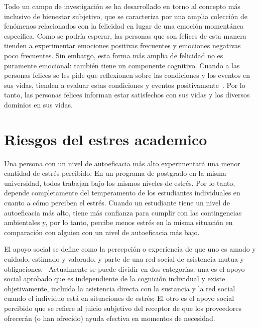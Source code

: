 \documentclass[jou,apacite]{apa6}
\begin{document}
Todo un campo de investigación se ha desarrollado en torno al concepto más inclusivo de bienestar subjetivo, que se caracteriza por una amplia colección de fenómenos relacionados con la felicidad en lugar de una emoción momentánea específica. Como se podría esperar, las personas que son felices de esta manera tienden a experimentar emociones positivas frecuentes y emociones negativas poco frecuentes. Sin embargo, esta forma más amplia de felicidad no es puramente emocional: también tiene un componente cognitivo. Cuando a las personas felices se les pide que reflexionen sobre las condiciones y los eventos en sus vidas, tienden a evaluar estas condiciones y eventos positivamente~\cite{Happi}. Por lo tanto, las personas felices informan estar satisfechos con sus vidas y los diversos dominios en sus vidas.


\section{Riesgos del estres academico}

Una persona con un nivel de autoeficacia más alto experimentará una menor cantidad de estrés percibido. En un programa de postgrado en la misma universidad, todos trabajan bajo los mismos niveles de estrés. Por lo tanto, depende completamente del temperamento de los estudiantes individuales en cuanto a cómo perciben el estrés. Cuando un estudiante tiene un nivel de autoeficacia más alto, tiene más confianza para cumplir con las contingencias ambientales y, por lo tanto, percibe menos estrés en la misma situación en comparación con alguien con un nivel de autoeficacia más bajo.


El apoyo social se define como la percepción o experiencia de que uno es amado y cuidado, estimado y valorado, y parte de una red social de asistencia mutua y obligaciones.~\cite{Dunkel} Actualmente se puede dividir en dos categorías: una es el apoyo social aprobado que es independiente de la cognición individual y existe objetivamente, incluida la asistencia directa con la sustancia y la red social cuando el individuo está en situaciones de estrés; El otro es el apoyo social percibido que se refiere al juicio subjetivo del receptor de que los proveedores ofrecerán (o han ofrecido) ayuda efectiva en momentos de necesidad.
\end{document}
